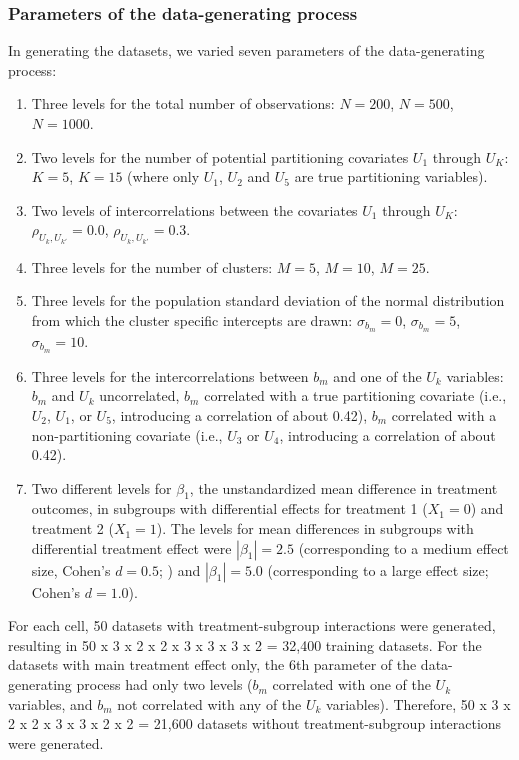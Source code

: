 \documentclass[nobf,doc]{apa}
\begin{document}
\subsubsection{Parameters of the data-generating process}

In generating the datasets, we varied seven parameters of the data-generating process:
 
\begin{enumerate} 
\item Three levels for the total number of observations: $N=200$, $N=500$, $N=1000$.
\item Two levels for the number of potential partitioning covariates $U_1$ through $U_K$: $K=5$, $K=15$ (where only $U_1$, $U_2$ and $U_5$ are true partitioning variables).
\item Two levels of intercorrelations between the covariates $U_1$ through $U_K$: $\rho_{U_{k},U_{k'}}=0.0$, $\rho_{U_{k},U_{k'}}=0.3$.
\item Three levels for the number of clusters: $M=5$, $M=10$, $M=25$.
\item Three levels for the population standard deviation of the normal distribution from which the cluster specific intercepts are drawn: $\sigma_{b_m}=0$, $\sigma_{b_m}=5$, $\sigma_{b_m}=10$.
\item Three levels for the intercorrelations between $b_m$ and one of the $U_k$ variables: $b_m$ and $U_k$ uncorrelated, $b_m$ correlated with a true partitioning covariate (i.e., $U_2$, $U_1$, or $U_5$, introducing a correlation of about 0.42), $b_m$ correlated with a non-partitioning covariate (i.e., $U_3$ or $U_4$, introducing a correlation of about 0.42). 
\item Two different levels for $\beta_1$, the unstandardized mean difference in treatment outcomes, in subgroups with differential effects for treatment 1 ($X_{1}=0$) and treatment 2 ($X_{1}=1$). The levels for mean differences in subgroups with differential treatment effect were $|\beta_1| = 2.5$ (corresponding to a medium effect size, Cohen's $d = 0.5$; ) and $|\beta_1| = 5.0$ (corresponding to a large effect size; Cohen's $d = 1.0$).
\end{enumerate}

For each cell, 50 datasets with treatment-subgroup interactions were generated, resulting in 50 x 3 x 2 x 2 x 3 x 3 x 3 x 2 = 32,400 training datasets. For the datasets with main treatment effect only, the 6th parameter of the data-generating process had only two levels ($b_m$ correlated with one of the $U_k$ variables, and $b_m$ not correlated with any of the $U_k$ variables). Therefore, 50 x 3 x 2 x 2 x 3 x 3 x 2 x 2 = 21,600 datasets without treatment-subgroup interactions were generated.
\end{document}
